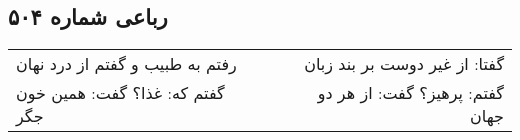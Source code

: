 \begin{center}
\section*{رباعی شماره ۵۰۴}
\label{sec:sh504}
\begin{longtable}{l p{0.5cm} r}
رفتم به طبیب و گفتم از درد نهان
&&
گفتا: از غیر دوست بر بند زبان
\\
گفتم که: غذا؟ گفت: همین خون جگر
&&
گفتم: پرهیز؟ گفت: از هر دو جهان
\\
\end{longtable}
\end{center}
